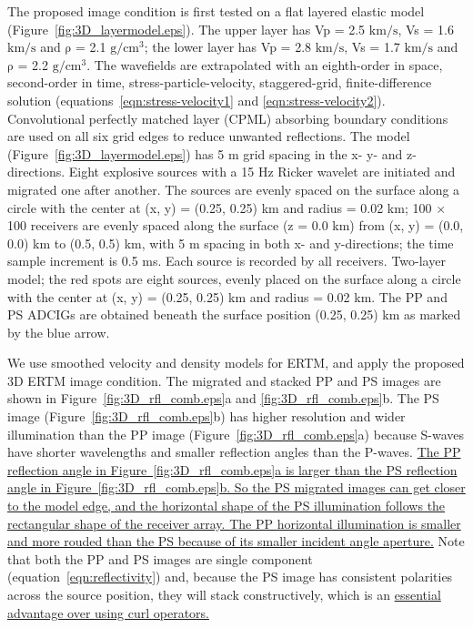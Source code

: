 \documentclass[manuscript,ulem,graphix,revised]{geophysics}
\begin{document}
The proposed image condition is first tested on a flat layered elastic model (Figure~\ref{fig:3D_layermodel.eps}). The upper layer has Vp = 2.5 $\mathrm{km/s}$,  Vs = 1.6 $\mathrm{km/s}$ and  $\mathrm{\rho}$ = 2.1 $\mathrm{g/cm^3}$; the lower layer has  Vp = 2.8 $\mathrm{km/s}$,  Vs = 1.7 $\mathrm{km/s}$ and  $\mathrm{\rho}$ = 2.2 $\mathrm{g/cm^3}$.
The wavefields are extrapolated with an eighth-order in space, second-order in time, stress-particle-velocity, staggered-grid, finite-difference solution (equations~\ref{eqn:stress-velocity1} and \ref{eqn:stress-velocity2}). Convolutional perfectly matched layer (CPML) absorbing boundary conditions \citep{komatitsch07} are used on all six grid edges to reduce unwanted reflections.
The model (Figure~\ref{fig:3D_layermodel.eps}) has 5 m grid spacing in the x- y- and z-directions. 
Eight explosive sources with a 15 Hz Ricker wavelet are initiated and migrated one after another. The sources are evenly spaced on the surface along a circle with the center at (x, y) = (0.25, 0.25) km and radius = 0.02 km; 100 $\times$ 100 receivers are evenly spaced along the surface (z = 0.0 km) from  (x, y) = (0.0, 0.0) km to (0.5, 0.5) km, with 5 m spacing in both x- and y-directions; the time sample increment is 0.5 ms. Each source is recorded by all receivers.
{
Two-layer model; the red spots are eight sources, evenly placed on the surface along a circle with the center at (x, y) = (0.25, 0.25) km and radius = 0.02 km. The PP and PS ADCIGs are obtained beneath the surface position (0.25, 0.25) km as marked by the blue arrow.
}

We use smoothed velocity and density models for ERTM, and apply the proposed 3D ERTM image condition. The migrated and stacked PP and PS images are shown in Figure~\ref{fig:3D_rfl_comb.eps}a and \ref{fig:3D_rfl_comb.eps}b. The PS image (Figure~\ref{fig:3D_rfl_comb.eps}b) has higher resolution and wider illumination than the PP image (Figure~\ref{fig:3D_rfl_comb.eps}a) because S-waves have shorter wavelengths and smaller reflection angles than the P-waves. \uline{The PP reflection angle in Figure~\ref{fig:3D_rfl_comb.eps}a is larger than the PS reflection angle in Figure~\ref{fig:3D_rfl_comb.eps}b. So the PS migrated images can get closer to the model edge, and the horizontal shape of the PS illumination follows the rectangular shape of the receiver array. The PP horizontal illumination is smaller and more rouded than the PS because of its smaller incident angle aperture.} Note that both the PP and PS images are single component (equation~\ref{eqn:reflectivity}) and, because the PS image has consistent polarities across the source position, they will stack constructively, which is an \marginpar{[1,10,12]} \uline{essential advantage over using curl operators. } 
\end{document}
